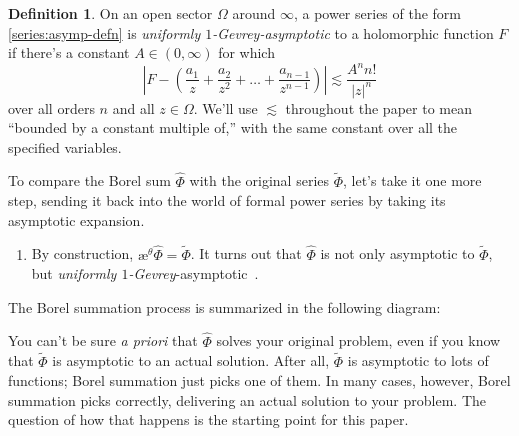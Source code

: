 \documentclass{article}
\theoremstyle{definition}
\newtheorem{defn}{Definition}
\newcommand{\series}[1]{\tilde{#1}}
\newcommand{\laplace}{\mathcal{L}}
\newcommand{\borel}{\mathcal{B}}
\newcommand{\aexp}{\text{\ae}}
\begin{document}
\begin{defn}\label{def:unif-gevrey-asymp}
On an open sector $\Omega$ around $\infty$, a power series of the form \eqref{series:asymp-defn} is {\em uniformly $1$-Gevrey-asymptotic} to a holomorphic function $F$ if there's a constant $A \in (0, \infty)$ for which
\[ \left|F - \left(\frac{a_1}{z} + \frac{a_2}{z^2} + \ldots + \frac{a_{n-1}}{z^{n-1}} \right) \right| \lesssim \frac{A^n n!}{|z|^n} \]
over all orders $n$ and all $z \in \Omega$. We'll use $\lesssim$ throughout the paper to mean ``bounded by a constant multiple of,'' with the same constant over all the specified variables.
\end{defn}
To compare the Borel sum $\hat{\Phi}$ with the original series $\series{\Phi}$, let's take it one more step, sending it back into the world of formal power series by taking its asymptotic expansion.

\begin{enumerate}[start=4]
\item By construction, $\aexp^\theta \hat{\Phi} = \series{\Phi}$. It turns out that $\hat{\Phi}$ is not only asymptotic to $\series{\Phi}$, but {\em {uniformly} $1$-Gevrey}-asymptotic~\cite[Corollary~5.23]{diverg-resurg-i}.
\end{enumerate}

The Borel summation process is summarized in the following diagram:
\begin{center}
\end{center}

You can't be sure {\em a priori} that $\hat{\Phi}$ solves your original problem, even if you know that $\series{\Phi}$ is asymptotic to an actual solution. After all, $\series{\Phi}$ is asymptotic to lots of functions; Borel summation just picks one of them. In many cases, however, Borel summation picks correctly, delivering an actual solution to your problem. The question of how that happens is the starting point for this paper.
\end{document}
